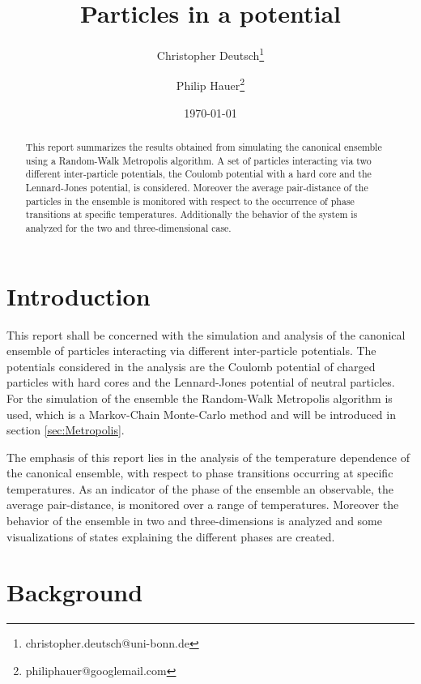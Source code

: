 \documentclass[11pt, a4paper]{article}
\title{Particles in a potential}
\author{Christopher Deutsch\footnote{christopher.deutsch@uni-bonn.de} \and Philip Hauer\footnote{philiphauer@googlemail.com}}
\date{\today}
\numberwithin{equation}{section}
\begin{document}
\begin{titlepage}

\maketitle

\begin{abstract}
\noindent
This report summarizes the results obtained from simulating the canonical ensemble using a Random-Walk Metropolis algorithm.
A set of particles interacting via two different inter-particle potentials, the Coulomb potential with a hard core and the Lennard-Jones potential, is considered.
Moreover the average pair-distance of the particles in the ensemble is monitored with respect to the occurrence of phase transitions at specific temperatures.
Additionally the behavior of the system is analyzed for the two and three-dimensional case.
\end{abstract}

\end{titlepage}

\tableofcontents
\newpage


\section{Introduction}
This report shall be concerned with the simulation and analysis of the canonical ensemble of particles interacting via different inter-particle potentials.
The potentials considered in the analysis are the Coulomb potential of charged particles with hard cores and the Lennard-Jones potential of neutral particles.
For the simulation of the ensemble the Random-Walk Metropolis algorithm is used, which is a Markov-Chain Monte-Carlo method and will be introduced in section \ref{sec:Metropolis}.

The emphasis of this report lies in the analysis of the temperature dependence of the canonical ensemble, with respect to phase transitions occurring at specific temperatures.
As an indicator of the phase of the ensemble an observable, the average pair-distance, is monitored over a range of temperatures.
Moreover the behavior of the ensemble in two and three-dimensions is analyzed and some visualizations of states explaining the different phases are created.

\section{Background}
\end{document}

